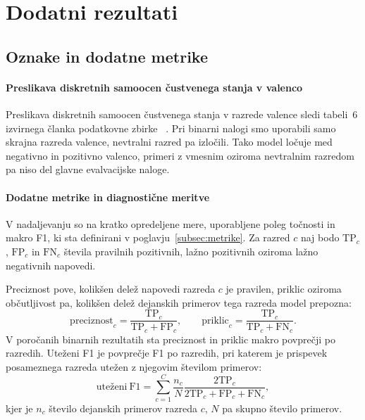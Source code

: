 \chapter{Dodatni rezultati}
\label{app:dodatni-rezultati}

\section{Oznake in dodatne metrike}

\subsubsection*{Preslikava diskretnih samoocen čustvenega stanja v valenco}
\label{app:preslikava-valence}

Preslikava diskretnih samoocen čustvenega stanja v razrede valence sledi tabeli~6 izvirnega članka podatkovne zbirke \MAHNOB{}~\cite{soleymani2012mahnob}.
Pri binarni nalogi smo uporabili samo skrajna razreda valence, nevtralni razred pa izločili.
Tako model ločuje med negativno in pozitivno valenco, primeri z vmesnim oziroma nevtralnim razredom pa niso del glavne evalvacijske naloge.



\subsubsection*{Dodatne metrike in diagnostične meritve}
\label{app:dodatne-metrike}

V nadaljevanju so na kratko opredeljene mere, uporabljene poleg točnosti in makro F1, ki sta definirani v poglavju~\ref{subsec:metrike}.
Za razred $c$ naj bodo $\mathrm{TP}_c$, $\mathrm{FP}_c$ in $\mathrm{FN}_c$ števila pravilnih pozitivnih, lažno pozitivnih oziroma lažno negativnih napovedi.

Preciznost pove, kolikšen delež napovedi razreda $c$ je pravilen, priklic oziroma občutljivost pa, kolikšen delež dejanskih primerov tega razreda model prepozna:
\[
    \mathrm{preciznost}_c = \frac{\mathrm{TP}_c}{\mathrm{TP}_c + \mathrm{FP}_c},
    \qquad
    \mathrm{priklic}_c = \frac{\mathrm{TP}_c}{\mathrm{TP}_c + \mathrm{FN}_c}.
\]
V poročanih binarnih rezultatih sta preciznost in priklic makro povprečji po razredih.
Uteženi F1 je povprečje F1 po razredih, pri katerem je prispevek posameznega razreda utežen z njegovim številom primerov:
\[
    \mathrm{uteženi\ F1}
    =
    \sum_{c=1}^{C}
    \frac{n_c}{N}
    \frac{2\mathrm{TP}_c}
         {2\mathrm{TP}_c+\mathrm{FP}_c+\mathrm{FN}_c},
\]
kjer je $n_c$ število dejanskih primerov razreda $c$, $N$ pa skupno število primerov.

